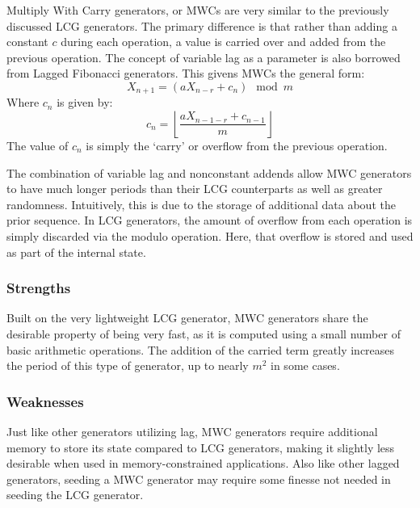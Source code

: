\def\lc{\left\lfloor}   
\def\rc{\right\rfloor}

Multiply With Carry generators, or MWCs are very similar to the previously discussed LCG generators. The primary difference is that rather than adding a constant $c$ during each operation, a value is carried over and added from the previous operation. The concept of variable lag as a parameter is also borrowed from Lagged Fibonacci generators. This givens MWCs the general form:
\begin{equation} \label{eq:mwc}
    X_{n+1} = (aX_{n-r} + c_n) \mod m
\end{equation}
Where $c_n$ is given by:
\begin{equation} \label{eq:mwc_c}
    c_n = \lc \frac{aX_{n-1-r} + c_{n-1}}{m} \rc
\end{equation}
The value of $c_n$ is simply the `carry' or overflow from the previous operation.

The combination of variable lag and nonconstant addends allow MWC generators to have much longer periods than their LCG counterparts as well as greater randomness. Intuitively, this is due to the storage of additional data about the prior sequence. In LCG generators, the amount of overflow from each operation is simply discarded via the modulo operation. Here, that overflow is stored and used as part of the internal state.

\subsubsection{Strengths}
Built on the very lightweight LCG generator, MWC generators share the desirable property of being very fast, as it is computed using a small number of basic arithmetic operations. The addition of the carried term greatly increases the period of this type of generator, up to nearly $m^2$ in some cases.

\subsubsection{Weaknesses}
Just like other generators utilizing lag, MWC generators require additional memory to store its state compared to LCG generators, making it slightly less desirable when used in memory-constrained applications. Also like other lagged generators, seeding a MWC generator may require some finesse not needed in seeding the LCG generator.
